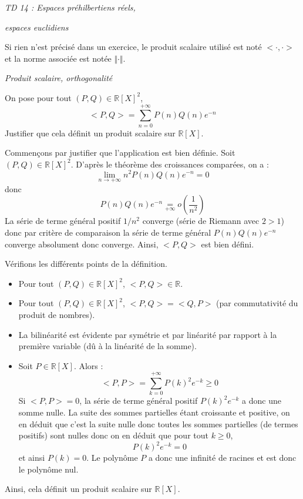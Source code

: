 \documentclass[a4paper,10pt]{report}
\begin{document}
\everymath{\displaystyle}


\begin{center}
\textit{{ {\huge TD 14 : Espaces préhilbertiens réels, }}}

\textit{{ {\huge espaces euclidiens}}}
\end{center}

\bigskip

\noindent Si rien n'est précisé dans un exercice, le produit scalaire utilisé est noté $< \cdot , \cdot >$ et la norme associée est notée $\Vert \cdot \Vert$.


\medskip

\begin{center}
\textit{{ {\large Produit scalaire, orthogonalité}}}
\end{center}

\medskip

\begin{Exa} On pose pour tout $(P,Q) \in \mathbb{R}[X]^2$,
$$ <P,Q> = \sum_{n=0}^{+ \infty} P(n) Q(n) e^{-n} $$
Justifier que cela définit un produit scalaire sur $\mathbb{R}[X]$.
\end{Exa}

\corr Commençons par justifier que l'application est bien définie. Soit $(P,Q) \in \mathbb{R}[X]^2$. D'après le théorème des croissances comparées, on a :
$$ \lim_{n \rightarrow + \infty} n^2 P(n)Q(n) e^{-n} = 0$$
donc
$$ P(n)Q(n) e^{-n} \underset{+ \infty}{=} o \left( \dfrac{1}{n^2} \right)$$
La série de terme général positif $1/n^2$ converge (série de Riemann avec $2>1$) donc par critère de comparaison la série de terme général $P(n)Q(n) e^{-n}$ converge absolument donc converge. Ainsi, $<P,Q>$ est bien défini.

\medskip

\noindent Vérifions les différents points de la définition.

\begin{itemize}
\item Pour tout $(P,Q) \in \mathbb{R}[X]^2$, $<P,Q> \in \mathbb{R}$.
\item Pour tout $(P,Q) \in \mathbb{R}[X]^2$, $<P,Q>= <Q,P>$ (par commutativité du produit de nombres).
\item La bilinéarité est évidente par symétrie et par linéarité par rapport à la première variable (dû à la linéarité de la somme).
\item Soit $P \in \mathbb{R}[X]$. Alors :
$$ <P,P> = \sum_{k=0}^{+\infty} P(k)^2 e^{-k} \geq 0$$
Si $<P,P>=0$, la série de terme général positif $P(k)^2 e^{-k}$ a donc une somme nulle. La suite des sommes partielles étant croissante et positive, on en déduit que c'est la suite nulle donc toutes les sommes partielles (de termes positifs) sont nulles donc on en déduit que pour tout $k \geq 0$,
$$ P(k)^2 e^{-k} = 0$$
et ainsi $P(k)=0$. Le polynôme $P$ a donc une infinité de racines et est donc le polynôme nul.
\end{itemize}
Ainsi, cela définit un produit scalaire sur $\mathbb{R}[X]$.
\end{document}
